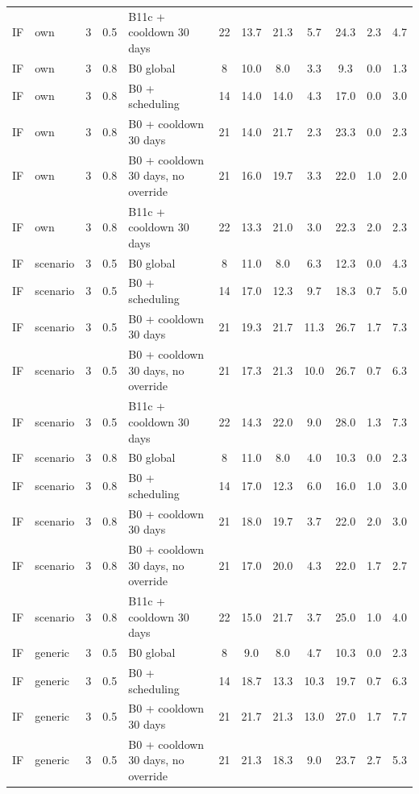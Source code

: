 \documentclass[10pt,onecolumn,letterpaper]{article}
\begin{document}
\begin{longtable}{lllllccccccc}
IF & own & 3 & 0.5 & B11c + cooldown 30 days & 22 & 13.7 & 21.3 & 5.7 & 24.3 & 2.3 & 4.7 \\
IF & own & 3 & 0.8 & B0 global & 8 & 10.0 & 8.0 & 3.3 & 9.3 & 0.0 & 1.3 \\
IF & own & 3 & 0.8 & B0 + scheduling & 14 & 14.0 & 14.0 & 4.3 & 17.0 & 0.0 & 3.0 \\
IF & own & 3 & 0.8 & B0 + cooldown 30 days & 21 & 14.0 & 21.7 & 2.3 & 23.3 & 0.0 & 2.3 \\
IF & own & 3 & 0.8 & B0 + cooldown 30 days, no override & 21 & 16.0 & 19.7 & 3.3 & 22.0 & 1.0 & 2.0 \\
IF & own & 3 & 0.8 & B11c + cooldown 30 days & 22 & 13.3 & 21.0 & 3.0 & 22.3 & 2.0 & 2.3 \\
IF & scenario & 3 & 0.5 & B0 global & 8 & 11.0 & 8.0 & 6.3 & 12.3 & 0.0 & 4.3 \\
IF & scenario & 3 & 0.5 & B0 + scheduling & 14 & 17.0 & 12.3 & 9.7 & 18.3 & 0.7 & 5.0 \\
IF & scenario & 3 & 0.5 & B0 + cooldown 30 days & 21 & 19.3 & 21.7 & 11.3 & 26.7 & 1.7 & 7.3 \\
IF & scenario & 3 & 0.5 & B0 + cooldown 30 days, no override & 21 & 17.3 & 21.3 & 10.0 & 26.7 & 0.7 & 6.3 \\
IF & scenario & 3 & 0.5 & B11c + cooldown 30 days & 22 & 14.3 & 22.0 & 9.0 & 28.0 & 1.3 & 7.3 \\
IF & scenario & 3 & 0.8 & B0 global & 8 & 11.0 & 8.0 & 4.0 & 10.3 & 0.0 & 2.3 \\
IF & scenario & 3 & 0.8 & B0 + scheduling & 14 & 17.0 & 12.3 & 6.0 & 16.0 & 1.0 & 3.0 \\
IF & scenario & 3 & 0.8 & B0 + cooldown 30 days & 21 & 18.0 & 19.7 & 3.7 & 22.0 & 2.0 & 3.0 \\
IF & scenario & 3 & 0.8 & B0 + cooldown 30 days, no override & 21 & 17.0 & 20.0 & 4.3 & 22.0 & 1.7 & 2.7 \\
IF & scenario & 3 & 0.8 & B11c + cooldown 30 days & 22 & 15.0 & 21.7 & 3.7 & 25.0 & 1.0 & 4.0 \\
IF & generic & 3 & 0.5 & B0 global & 8 & 9.0 & 8.0 & 4.7 & 10.3 & 0.0 & 2.3 \\
IF & generic & 3 & 0.5 & B0 + scheduling & 14 & 18.7 & 13.3 & 10.3 & 19.7 & 0.7 & 6.3 \\
IF & generic & 3 & 0.5 & B0 + cooldown 30 days & 21 & 21.7 & 21.3 & 13.0 & 27.0 & 1.7 & 7.7 \\
IF & generic & 3 & 0.5 & B0 + cooldown 30 days, no override & 21 & 21.3 & 18.3 & 9.0 & 23.7 & 2.7 & 5.3 \\

\end{longtable}
\end{document}
